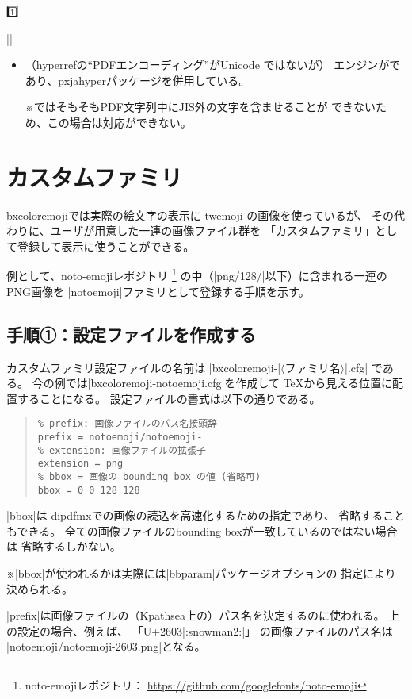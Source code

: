 \documentclass[a4paper]{ltjsarticle}
\renewcommand{\headfont}{\romanseries{sbc}\sffamily}
\newcommand{\CE}[1]{\coloremoji{#1}}
\newcommand{\Pkg}[1]{\textsf{#1}}
\newcommand{\Meta}[1]{$\langle$\mbox{}#1\mbox{}$\rangle$}
\newcommand{\Note}{\par\noindent ※}
\newcommand{\Means}{：\quad}
\newcommand{\／}{\mbox{}／\mbox{}}
\providecommand{\Strong}[1]{{\headfont#1}}
\begin{document}
\begin{coloremojiautolist}{1️⃣}
\begin{coloremojiautolist}{|\CE{♠}|}
\begin{itemize}
\item （\Pkg{hyperref}の“PDFエンコーディング”がUnicode ではないが）
  エンジンが{\upLaTeX}であり、\Pkg{pxjahyper}パッケージを併用している。
  \Note {\pLaTeX}ではそもそもPDF文字列中にJIS外の文字を含ませることが
  できないため、この場合は対応ができない。
\end{itemize}

\section{カスタムファミリ}
\label{sec:Custom-Families}

\Pkg{bxcoloremoji}では実際の絵文字の表示に
twemoji の画像を使っているが、
その代わりに、ユーザが用意した一連の画像ファイル群を
「\Strong{カスタムファミリ}」として登録して表示に使うことができる。

例として、noto-emojiレポジトリ
\footnote{noto-emojiレポジトリ\Means
  \url{https://github.com/googlefonts/noto-emoji}}%
の中（|png/128/|以下）に含まれる一連のPNG画像を
|notoemoji|ファミリとして登録する手順を示す。

\subsection{手順①：設定ファイルを作成する}

カスタムファミリ設定ファイルの名前は
|bxcoloremoji-|\Meta{ファミリ名}|.cfg|%
である。
今の例では|bxcoloremoji-notoemoji.cfg|を作成して
{\TeX}から見える位置に配置することになる。
設定ファイルの書式は以下の通りである。

\begin{quote}\small\begin{verbatim}
% prefix: 画像ファイルのパス名接頭辞
prefix = notoemoji/notoemoji-
% extension: 画像ファイルの拡張子
extension = png
% bbox = 画像の bounding box の値 (省略可)
bbox = 0 0 128 128
\end{verbatim}\end{quote}

|bbox|は dipdfmxでの画像の読込を高速化するための指定であり、
省略することもできる。
全ての画像ファイルのbounding boxが一致しているのではない場合は
省略するしかない。

\Note |bbox|が使われるかは実際には|bbparam|パッケージオプションの
指定により決められる。

|prefix|は画像ファイルの（Kpathsea上の）パス名を決定するのに使われる。
上の設定の場合、例えば、
「U+2603\CE{☃}|:snowman2:|」
の画像ファイルのパス名は
|notoemoji/notoemoji-2603.png|となる。


\end{coloremojiautolist}
\end{coloremojiautolist}
\end{document}
